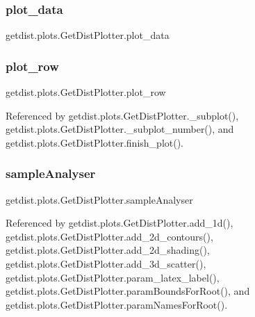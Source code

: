 \subsubsection{\texorpdfstring{plot\+\_\+data}{plot\_data}}
{\footnotesize\ttfamily getdist.\+plots.\+Get\+Dist\+Plotter.\+plot\+\_\+data}

\mbox{\label{classgetdist_1_1plots_1_1GetDistPlotter_ac0745694a94d98e3d169596c10d4e372}} 
\subsubsection{\texorpdfstring{plot\+\_\+row}{plot\_row}}
{\footnotesize\ttfamily getdist.\+plots.\+Get\+Dist\+Plotter.\+plot\+\_\+row}



Referenced by getdist.\+plots.\+Get\+Dist\+Plotter.\+\_\+subplot(), getdist.\+plots.\+Get\+Dist\+Plotter.\+\_\+subplot\+\_\+number(), and getdist.\+plots.\+Get\+Dist\+Plotter.\+finish\+\_\+plot().

\mbox{\label{classgetdist_1_1plots_1_1GetDistPlotter_a54543d5a03405a48e98f2e362e076d38}} 
\subsubsection{\texorpdfstring{sample\+Analyser}{sampleAnalyser}}
{\footnotesize\ttfamily getdist.\+plots.\+Get\+Dist\+Plotter.\+sample\+Analyser}



Referenced by getdist.\+plots.\+Get\+Dist\+Plotter.\+add\+\_\+1d(), getdist.\+plots.\+Get\+Dist\+Plotter.\+add\+\_\+2d\+\_\+contours(), getdist.\+plots.\+Get\+Dist\+Plotter.\+add\+\_\+2d\+\_\+shading(), getdist.\+plots.\+Get\+Dist\+Plotter.\+add\+\_\+3d\+\_\+scatter(), getdist.\+plots.\+Get\+Dist\+Plotter.\+param\+\_\+latex\+\_\+label(), getdist.\+plots.\+Get\+Dist\+Plotter.\+param\+Bounds\+For\+Root(), and getdist.\+plots.\+Get\+Dist\+Plotter.\+param\+Names\+For\+Root().


